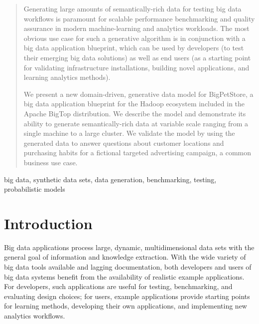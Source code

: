 \documentclass[conference]{IEEEtran}
\begin{document}
\begin{abstract}
Generating large amounts of semantically-rich data for testing big data workflows is paramount for scalable performance benchmarking and quality assurance in modern machine-learning and analytics workloads.  The most obvious use case for such a generative algorithm is in conjunction with a big data application blueprint, which can be used by developers (to test their emerging big data solutions) as well as end users (as a starting point for validating infrastructure installations, building novel applications, and learning analytics methods).

We present a new domain-driven, generative data model for BigPetStore, a big data application blueprint for the Hadoop ecosystem included in the Apache BigTop distribution. We describe the model and demonstrate its ability to generate semantically-rich data at variable scale ranging from a single machine to a large cluster.  We validate the model by using the generated data to answer questions about customer locations and purchasing habits for a fictional targeted advertising campaign, a common business use case.

\end{abstract}
 
\begin{IEEEkeywords}
big data, synthetic data sets, data generation, benchmarking, testing, probabilistic models
\end{IEEEkeywords}

%
\IEEEpeerreviewmaketitle

\section{Introduction}
Big data applications process large, dynamic, multidimensional data sets with the general goal of information and knowledge extraction.  With the wide variety of big data tools available and lagging documentation, both developers and users of big data systems benefit from the availability of realistic example applications.  For developers, such applications are useful for testing, benchmarking, and evaluating design choices; for users, example applications provide starting points for learning methods, developing their own applications, and implementing new analytics workflows.
\end{document}
